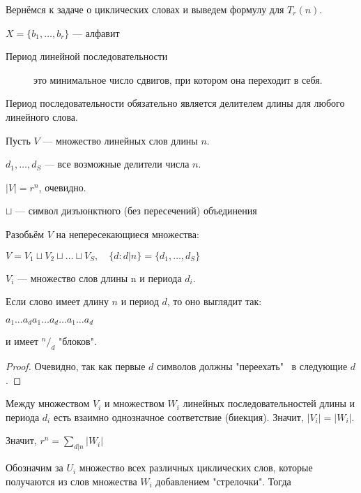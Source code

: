 Вернёмся к задаче о циклических словах и выведем формулу для $T_r (n)$. 

$X = \{b_1, \dots, b_r\} $ --- алфавит


\begin{description}
\item[Период линейной последовательности] это минимальное число сдвигов, при котором она переходит в себя.
\end{description}

\begin{alem}
Период последовательности обязательно является делителем длины для любого линейного слова. 
\end{alem}
 
 

Пусть $V$ --- множество линейных слов длины $n$.

$d_1, \dots, d_S $ --- все возможные делители числа $n$.

$|V| = r^n $, очевидно.

\begin{rem}
$ \sqcup $ --- символ дизъюнктного (без пересечений) объединения
\end{rem}

Разобьём  $V$ на непересекающиеся множества:


$
V = V_1 \sqcup V_2 \sqcup  \dots \sqcup V_S , \quad \{d: d|n\} = \{d_1, \dots, d_S\}
$

$V_i$ --- множество слов длины n и периода $d_i$.



\begin{alem} Если слово имеет длину $n$ и период $d$, то оно выглядит так:

$ 
a_1 \dots a_d a_1  \dots a_d \dots a_1 \dots a_d
$

и имеет $^n /_d$ "блоков".
\end{alem}
\begin{proof}
Очевидно, так как первые $d$ символов должны "переехать" \ в следующие $d$.
\end{proof}

\begin{cor} 
Между множеством $V_i$ и множеством  $W_i$ линейных последовательностей длины и периода $d_i$ есть взаимно однозначное соответствие (биекция). Значит, $|V_i| = |W_i|$.
\end{cor}


Значит, 
$r^n = \sum \limits _{d|n} |W_i|$
 
   
Обозначим за $U_i$  множество всех различных циклических слов, которые получаются из слов множества $W_i$ добавлением "стрелочки". Тогда

